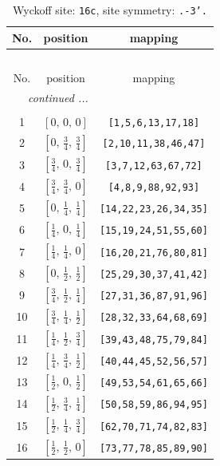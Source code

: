 \documentclass[fleqn,8pt]{jsarticle}
\begin{document}
\begin{longtable}{ccc}
\caption{Wyckoff site: {\tt 16c}, site symmetry: {\tt .-3'.}}
 \\
 \hline \hline
No. & position & mapping \\ \hline \endfirsthead

\multicolumn{2}{l}{\tablename\ \thetable{}} \\
 \hline \hline
No. & position & mapping \\ \hline \endhead

 \hline \hline
\multicolumn{2}{r}{\footnotesize\it continued ...} \\ \endfoot

 \hline \hline
\multicolumn{2}{r}{} \\ \endlastfoot

1 & $\left[ 0,\, 0,\, 0 \right]$ & {\tt [1,5,6,13,17,18]} \\ \hline
2 & $\left[ 0,\, \frac{3}{4},\, \frac{3}{4} \right]$ & {\tt [2,10,11,38,46,47]} \\ \hline
3 & $\left[ \frac{3}{4},\, 0,\, \frac{3}{4} \right]$ & {\tt [3,7,12,63,67,72]} \\ \hline
4 & $\left[ \frac{3}{4},\, \frac{3}{4},\, 0 \right]$ & {\tt [4,8,9,88,92,93]} \\ \hline
5 & $\left[ 0,\, \frac{1}{4},\, \frac{1}{4} \right]$ & {\tt [14,22,23,26,34,35]} \\ \hline
6 & $\left[ \frac{1}{4},\, 0,\, \frac{1}{4} \right]$ & {\tt [15,19,24,51,55,60]} \\ \hline
7 & $\left[ \frac{1}{4},\, \frac{1}{4},\, 0 \right]$ & {\tt [16,20,21,76,80,81]} \\ \hline
8 & $\left[ 0,\, \frac{1}{2},\, \frac{1}{2} \right]$ & {\tt [25,29,30,37,41,42]} \\ \hline
9 & $\left[ \frac{3}{4},\, \frac{1}{2},\, \frac{1}{4} \right]$ & {\tt [27,31,36,87,91,96]} \\ \hline
10 & $\left[ \frac{3}{4},\, \frac{1}{4},\, \frac{1}{2} \right]$ & {\tt [28,32,33,64,68,69]} \\ \hline
11 & $\left[ \frac{1}{4},\, \frac{1}{2},\, \frac{3}{4} \right]$ & {\tt [39,43,48,75,79,84]} \\ \hline
12 & $\left[ \frac{1}{4},\, \frac{3}{4},\, \frac{1}{2} \right]$ & {\tt [40,44,45,52,56,57]} \\ \hline
13 & $\left[ \frac{1}{2},\, 0,\, \frac{1}{2} \right]$ & {\tt [49,53,54,61,65,66]} \\ \hline
14 & $\left[ \frac{1}{2},\, \frac{3}{4},\, \frac{1}{4} \right]$ & {\tt [50,58,59,86,94,95]} \\ \hline
15 & $\left[ \frac{1}{2},\, \frac{1}{4},\, \frac{3}{4} \right]$ & {\tt [62,70,71,74,82,83]} \\ \hline
16 & $\left[ \frac{1}{2},\, \frac{1}{2},\, 0 \right]$ & {\tt [73,77,78,85,89,90]} \\
\end{longtable}
\end{document}

